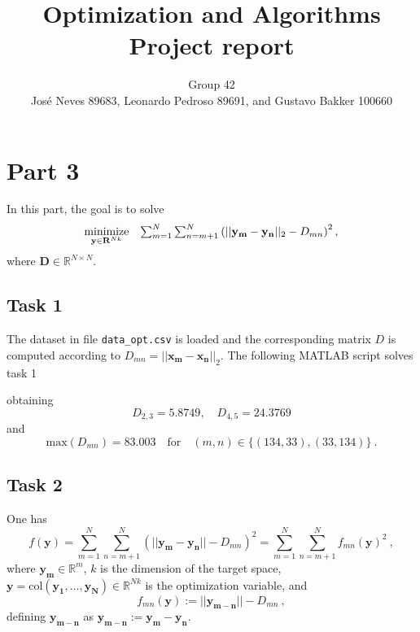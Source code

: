 \documentclass[12pt]{article}
\title{Optimization and Algorithms \\ Project report}
\author{Group 42 \\ Jos{\'e} Neves 89683, Leonardo Pedroso 89691, and Gustavo Bakker 100660}
\date{}
\begin{document}
\maketitle


\section{Part 3}
In this part, the goal is to solve
\begin{equation} \label{eq:problemT4}
\begin{array}[t]{ll} 
\underset{\mathbf{y} \in \mathbf{R}^{Nk}}{\text{minimize}} & \sum_{m=1}^{N}\sum_{n=m+1}^{N}\left(||\mathbf{y_m}-\mathbf{y_n}||_2-D_{mn}\right)^2 ,\\
\end{array} 
\end{equation}
where $\mathbf{D}\in\mathbb{R}^{N\times N}$.
\subsection{Task 1}
The dataset in file \verb|data_opt.csv| is loaded and the corresponding matrix $D$ is computed according to $D_{mn} = ||\mathbf{x_m}-\mathbf{x_n}||_2$. The following MATLAB script solves task 1

obtaining 
\begin{equation*}\label{key}
D_{2,3} = 5.8749, \quad D_{4,5} = 24.3769
\end{equation*} 
and 
\begin{equation*}\label{key}
\mathrm{max}(D_{mn}) = 83.003 \quad \text{for} \quad (m,n) \in \{(134,33),(33,134)\}\:.
\end{equation*}

\subsection{Task 2}
One has 
\begin{equation}\label{eq:deff}
f(\mathbf{y}) = \sum_{m=1}^{N}\sum_{n=m+1}^{N}(||\mathbf{y_m}-\mathbf{y_n}||-D_{mn})^2 = \sum_{m=1}^{N}\sum_{n=m+1}^{N} f_{mn}(\mathbf{y})^2 \:,
\end{equation}
where $\mathbf{y_m}\in \mathbb{R}^m$, $k$ is the dimension of the target space, $\mathbf{y} = \mathrm{col}(\mathbf{y_1},\ldots,\mathbf{y_N}) \in \mathbb{R}^{Nk}$ is the optimization variable, and 
\begin{equation}\label{eq:deffmn}
f_{mn}(\mathbf{y}) := ||\mathbf{y_{m-n}}||-D_{mn}\:,
\end{equation}
defining $\mathbf{y_{m-n}}$ as $\mathbf{y_{m-n}}:=\mathbf{y_m}-\mathbf{y_n}$. 
\end{document}
